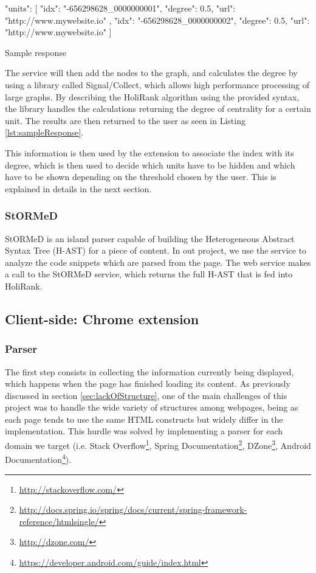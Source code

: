 \begin{listing}[H]
\centering	
\begin{jsoncode}
{
  "units": [
    {
      "idx": "-656298628_0000000001",
      "degree": 0.5,
      "url": "http://www.mywebsite.io"
    },
    {
      "idx": "-656298628_0000000002",
      "degree": 0.5,
      "url": "http://www.mywebsite.io"
    }
  ]
}
\end{jsoncode}
\caption{Sample response}
\label{lst:sampleResponse}
\end{listing}

The service will then add the nodes to the graph, and calculates the degree by using a library called Signal/Collect\cite{Stutz:2010:SGA:1940281.1940330}, which allows high performance processing of large graphs. By describing the HoliRank algorithm using the provided syntax, the library handles the calculations returning the degree of centrality for a certain unit. The results are then returned to the user as seen in Listing \ref{lst:sampleResponse}.

This information is then used by the extension to associate the index with its degree, which is then used to decide which units have to be hidden and which have to be shown depending on the threshold chosen by the user. This is explained in details in the next section.

\subsubsection{StORMeD}
StORMeD\cite{Ponz2015a} is an island parser capable of building the Heterogeneous Abstract Syntax Tree (H-AST) for a piece of content. In out project, we use the service to analyze the code snippets which are parsed from the page. The web service makes a call to the StORMeD service, which returns the full H-AST that is fed into HoliRank.

\subsection{Client-side: Chrome extension}
\subsubsection{Parser}
The first step consists in collecting the information currently being displayed, which happens when the page has finished loading its content. As previously discussed in section \ref{sec:lackOfStructure}, one of the main challenges of this project was to handle the wide variety of structures among webpages, being as each page tends to use the same HTML constructs but widely differ in the implementation. This hurdle was solved by implementing a parser for each domain we target (i.e. Stack Overflow\footnote{\url{http://stackoverflow.com/}}, Spring Documentation\footnote{\url{http://docs.spring.io/spring/docs/current/spring-framework-reference/htmlsingle/}}, DZone\footnote{\url{http://dzone.com/}}, Android Documentation\footnote{\url{https://developer.android.com/guide/index.html}}).

